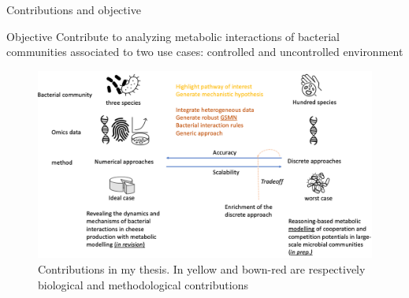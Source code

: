 \documentclass[8pt,usenames,dvipsnames]{beamer}
\begin{document}
\begin{frame}{Contributions and objective}
\vspace{-0.3cm}
\begin{block}{Objective}
 Contribute to analyzing metabolic interactions of bacterial communities associated to two use cases: controlled and uncontrolled environment
\end{block}
\begin{figure}
\includegraphics[width=\textwidth]{figures/objective}
\vspace{-0.6cm}\caption{Contributions in my thesis. In yellow and bown-red are respectively biological and methodological contributions}
\end{figure}



\end{frame}
\end{document}
